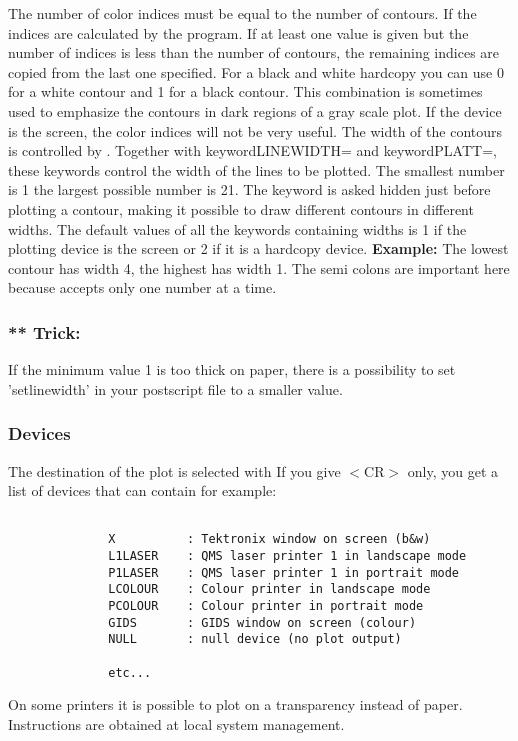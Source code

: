 The number of color indices must be equal to the number of 
contours. If  the indices are calculated by the 
program. If at least one value is given but the number of
indices is less than the number of contours, the remaining
indices are copied from the last one specified.
For a black and white hardcopy you can use 0 for a white
contour and 1 for a black contour. This combination is
sometimes used to emphasize the contours in dark regions
of a gray scale plot. If the device is the screen, the
color indices will not be very useful. The width of the
contours is controlled by . Together with 
keyword{LINEWIDTH=} and 
keyword{PLATT=}, these keywords control the width of the lines to
be plotted. The smallest number is 1 the largest possible
number is 21. The  keyword is asked hidden just
before plotting a contour, making it possible to draw
different contours in different widths. The default values
of all the keywords containing widths is 1 if the plotting
device is the screen or 2 if it is a hardcopy device.
{\bf Example:} 
The lowest contour has width 4, the highest has width 1.
The semi colons are important here because  accepts
only one number at a time.
              
\subsubsection*{** Trick:}
              If the minimum value 1 is too thick on paper, there is a
              possibility to set 'setlinewidth' in your postscript file
              to a smaller value.
              
\subsubsection*{Devices}
              
The destination of the plot is selected with 
If you give $<$CR$>$ only, you get a list of devices that can
contain for example:

\begin{verbatim}

              X          : Tektronix window on screen (b&w)
              L1LASER    : QMS laser printer 1 in landscape mode
              P1LASER    : QMS laser printer 1 in portrait mode
              LCOLOUR    : Colour printer in landscape mode                 
              PCOLOUR    : Colour printer in portrait mode
              GIDS       : GIDS window on screen (colour)
              NULL       : null device (no plot output)

              etc...

\end{verbatim}
On some printers it is possible to plot on a transparency
instead of paper. Instructions are obtained at local
system management.
              
